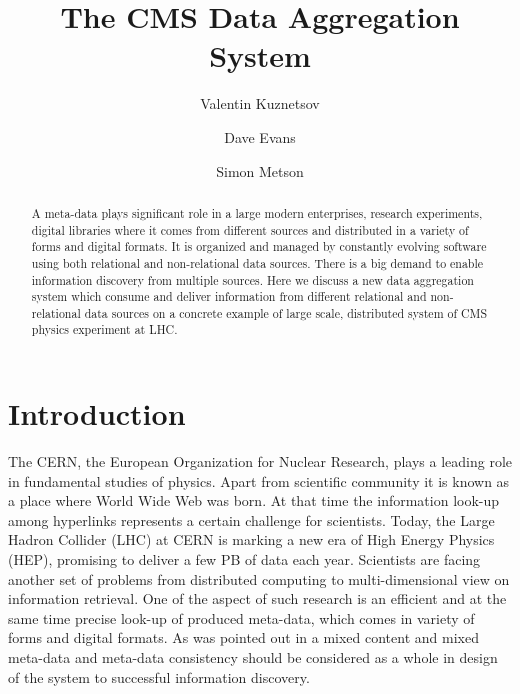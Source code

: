 \documentclass[a4paper]{jpconf}
\begin{document}
\title{The CMS Data Aggregation System}

\author{Valentin Kuznetsov}
\address{Cornell University, Ithaca, New York, USA}

\author{Dave Evans}
\address{Fermilab, Batavia, Illinois, USA}

\author{Simon Metson}
\address{Bristol University, Bristol, UK}



\begin{abstract}
A meta-data plays significant role in a large modern enterprises, research experiments,
digital libraries where it comes from different sources and distributed in a 
variety of forms and digital formats. It is organized and managed by constantly
evolving software using both relational and non-relational data sources. There is
a big demand to enable information discovery from multiple sources.
Here we discuss a new data aggregation system which consume and deliver information 
from different relational and non-relational data sources on a concrete example 
of large scale, distributed system of CMS physics experiment at LHC.
\end{abstract}

\newpage

\section{Introduction}
The CERN, the European Organization for Nuclear Research, plays a leading
role in fundamental studies of physics. Apart from scientific community 
it is known as a place where World Wide Web was born. At that time the 
information look-up among hyperlinks represents a certain challenge for scientists.
Today, the Large Hadron Collider (LHC) at CERN is marking a new era of High Energy
Physics (HEP), promising to deliver a few PB of data each year. Scientists are
facing another set of problems from distributed computing to multi-dimensional
view on information retrieval. One of the aspect of such research is an efficient
and at the same time precise look-up of produced meta-data, which comes in variety 
of forms and digital formats. As was pointed out in \cite{Arms} a mixed content and 
mixed meta-data and meta-data consistency should be considered as a whole in design 
of the system to successful information discovery. 
\end{document}
